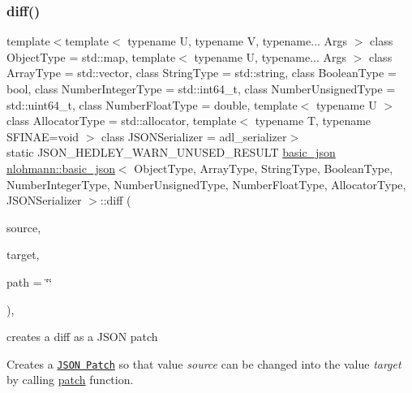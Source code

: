 \subsubsection{\texorpdfstring{diff()}{diff()}}
{\footnotesize\ttfamily template$<$template$<$ typename U, typename V, typename... Args $>$ class Object\+Type = std\+::map, template$<$ typename U, typename... Args $>$ class Array\+Type = std\+::vector, class String\+Type  = std\+::string, class Boolean\+Type  = bool, class Number\+Integer\+Type  = std\+::int64\+\_\+t, class Number\+Unsigned\+Type  = std\+::uint64\+\_\+t, class Number\+Float\+Type  = double, template$<$ typename U $>$ class Allocator\+Type = std\+::allocator, template$<$ typename T, typename S\+F\+I\+N\+A\+E=void $>$ class J\+S\+O\+N\+Serializer = adl\+\_\+serializer$>$ \\
static J\+S\+O\+N\+\_\+\+H\+E\+D\+L\+E\+Y\+\_\+\+W\+A\+R\+N\+\_\+\+U\+N\+U\+S\+E\+D\+\_\+\+R\+E\+S\+U\+LT \mbox{\hyperlink{classnlohmann_1_1basic__json}{basic\+\_\+json}} \mbox{\hyperlink{classnlohmann_1_1basic__json}{nlohmann\+::basic\+\_\+json}}$<$ Object\+Type, Array\+Type, String\+Type, Boolean\+Type, Number\+Integer\+Type, Number\+Unsigned\+Type, Number\+Float\+Type, Allocator\+Type, J\+S\+O\+N\+Serializer $>$\+::diff (\begin{DoxyParamCaption}\item[{const \mbox{\hyperlink{classnlohmann_1_1basic__json}{basic\+\_\+json}}$<$ Object\+Type, Array\+Type, String\+Type, Boolean\+Type, Number\+Integer\+Type, Number\+Unsigned\+Type, Number\+Float\+Type, Allocator\+Type, J\+S\+O\+N\+Serializer $>$ \&}]{source,  }\item[{const \mbox{\hyperlink{classnlohmann_1_1basic__json}{basic\+\_\+json}}$<$ Object\+Type, Array\+Type, String\+Type, Boolean\+Type, Number\+Integer\+Type, Number\+Unsigned\+Type, Number\+Float\+Type, Allocator\+Type, J\+S\+O\+N\+Serializer $>$ \&}]{target,  }\item[{const std\+::string \&}]{path = {\ttfamily \char`\"{}\char`\"{}} }\end{DoxyParamCaption})\hspace{0.3cm}{\ttfamily [inline]}, {\ttfamily [static]}}



creates a diff as a J\+S\+ON patch 

Creates a \href{http://jsonpatch.com}{\tt J\+S\+ON Patch} so that value {\itshape source} can be changed into the value {\itshape target} by calling \mbox{\hyperlink{classnlohmann_1_1basic__json_a81e0c41a4a9dff4df2f6973f7f8b2a83}{patch}} function.

